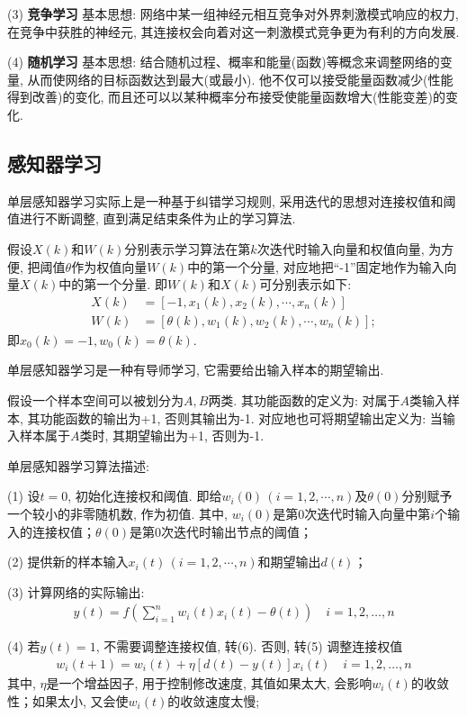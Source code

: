 (3) \textbf{竞争学习} 基本思想: 网络中某一组神经元相互竞争对外界刺激模式响应的权力, 在竞争中获胜的神经元, 其连接权会向着对这一刺激模式竞争更为有利的方向发展.

(4) \textbf{随机学习} 基本思想: 结合随机过程、概率和能量(函数)等概念来调整网络的变量, 从而使网络的目标函数达到最大(或最小). 他不仅可以接受能量函数减少(性能得到改善)的变化, 而且还可以以某种概率分布接受使能量函数增大(性能变差)的变化.
\subsection{感知器学习}

单层感知器学习实际上是一种基于纠错学习规则, 采用迭代的思想对连接权值和阈值进行不断调整, 直到满足结束条件为止的学习算法.

假设$X(k)$和$W(k)$分别表示学习算法在第$k$次迭代时输入向量和权值向量, 为方便, 把阈值$\theta$作为权值向量$W(k)$中的第一个分量, 对应地把“-1”固定地作为输入向量$X(k)$中的第一个分量. 即$W(k)$和$X(k)$可分别表示如下:
\begin{align}
X(k)&=[-1, x_1(k), x_2(k),\cdots, x_n(k)]\\
W(k)&=[\theta(k),w_1(k), w_2(k),\cdots,w_n(k)];
\end{align}
即$x_0(k)=-1, w_0(k)=θ(k)$.

单层感知器学习是一种有导师学习, 它需要给出输入样本的期望输出.

假设一个样本空间可以被划分为$A, B$两类. 其功能函数的定义为: 对属于$A$类输入样本, 其功能函数的输出为+1, 否则其输出为-1. 对应地也可将期望输出定义为: 当输入样本属于$A$类时, 其期望输出为+1, 否则为-1.

单层感知器学习算法描述:

     (1) 设$t=0$, 初始化连接权和阈值. 即给$w_i(0)\,(i=1, 2, \cdots,n)$及$\theta(0)$分别赋予一个较小的非零随机数, 作为初值. 其中, $w_i(0)$是第0次迭代时输入向量中第$i$个输入的连接权值；$\theta(0)$是第0次迭代时输出节点的阈值；

     (2) 提供新的样本输入$x_i(t)\,(i=1, 2,\cdots, n)$和期望输出$d(t)$；

     (3) 计算网络的实际输出:
        \begin{align}
          y(t)=f\left(\sum_{i=1}^{n} w_{i}(t) x_{i}(t)-\theta(t)\right) \quad i=1,2, \ldots, n
        \end{align}

     (4) 若$y(t)=1$, 不需要调整连接权值, 转(6). 否则, 转(5) 调整连接权值
        \begin{align}
          w_{i}(t+1)=w_{i}(t)+\eta[d(t)-y(t)] x_{i}(t) \quad i=1,2, \ldots, n
        \end{align}
        其中, $\eta$是一个增益因子, 用于控制修改速度, 其值如果太大, 会影响$w_i(t)$的收敛性；如果太小, 又会使$w_i(t)$的收敛速度太慢;

